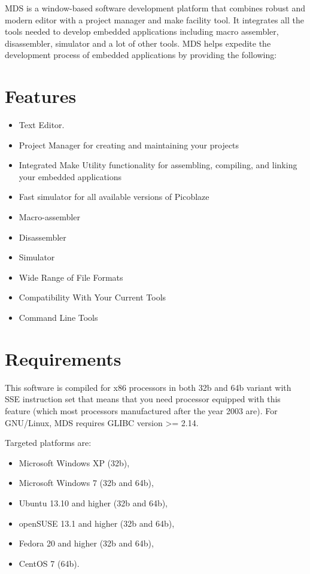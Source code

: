 MDS is a window-based software development platform that combines robust and modern editor with a project manager and make facility tool.
It integrates all the tools needed to develop embedded applications including macro assembler, disassembler, simulator and a lot of
other tools. MDS helps expedite the development process of embedded applications by providing the following:

\section{Features}
    \begin{itemize}
        \item Text Editor.
        \item Project Manager for creating and maintaining your projects
        \item Integrated Make Utility functionality for assembling, compiling, and linking your embedded applications
        \item Fast simulator for all available versions of Picoblaze
        \item Macro-assembler
        \item Disassembler
        \item Simulator
        \item Wide Range of File Formats
        \item Compatibility With Your Current Tools
        \item Command Line Tools
    \end{itemize}

\section{Requirements}
    This software is compiled for x86 processors in both 32b and 64b variant with SSE instruction set
    that means that you need processor equipped with this feature (which most processors manufactured after the year 2003 are).
    For GNU/Linux, MDS requires GLIBC version >= 2.14.

    Targeted platforms are:
    \begin{itemize}
        \item Microsoft Windows XP (32b),
        \item Microsoft Windows 7 (32b and 64b),
        \item Ubuntu 13.10 and higher (32b and 64b),
        \item openSUSE 13.1 and higher (32b and 64b),
        \item Fedora 20 and higher (32b and 64b),
        \item CentOS 7 (64b).
    \end{itemize}
